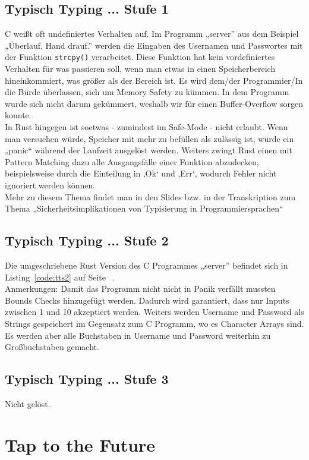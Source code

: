\documentclass[12pt, a4paper, titlepage, oneside]{scrartcl}
\begin{document}
	\subsection{Typisch Typing ... Stufe 1}
	C weißt oft undefiniertes Verhalten auf. Im Programm „server” aus dem Beispiel „Überlauf. Hand
	drauf.” werden die Eingaben des Usernamen und Passwortes mit der Funktion \lstinline{strcpy()} verarbeitet.
	Diese Funktion hat kein vordefiniertes Verhalten für was passieren soll, wenn man etwas in einen
	Speicherbereich hineinkommiert, was größer als der Bereich ist. Es wird dem/der Programmier/In
	die Bürde überlassen, sich um Memory Safety zu kümmen. In dem Programm wurde sich nicht
	darum gekümmert, weshalb wir für einen Buffer-Overflow sorgen konnte. \\
	In Rust hingegen ist soetwas - zumindest im Safe-Mode - nicht erlaubt. Wenn man versuchen
	würde, Speicher mit mehr zu befüllen als zulässig ist, würde ein „panic“ während der Laufzeit
	ausgelöst werden. Weiters zwingt Rust einen mit Pattern Matching dazu alle Ausgangsfälle einer
	Funktion abzudecken, beispielsweise durch die Einteilung in ‚Ok‘ und ‚Err‘, wodurch Fehler nicht
	ignoriert werden können. \\
	Mehr zu diesem Thema findet man in den Slides bzw. in der Transkription zum Thema
	„Sicherheitsimplikationen von Typisierung in Programmiersprachen“

	\subsection{Typisch Typing ... Stufe 2}
	Die umgeschriebene Rust Version des C Programmes „server” befindet sich in Listing~\ref*{code:tts2} auf Seite~\pageref*{code:tts2} . \\
	Anmerkungen: Damit das Programm nicht nicht in Panik verfällt mussten Bounds Checks
	hinzugefügt werden. Dadurch wird garantiert, dass nur Inputs zwischen 1 und 10 akzeptiert werden.
	Weiters werden Username und Password als Strings gespeichert im Gegensatz zum C Programm,
	wo es Character Arrays sind. Es werden aber alle Buchstaben in Username und Password weiterhin
	zu Großbuchstaben gemacht.

	\subsection{Typisch Typing ... Stufe 3}
	Nicht gelöst.

	\section{Tap to the Future}
\end{document}
